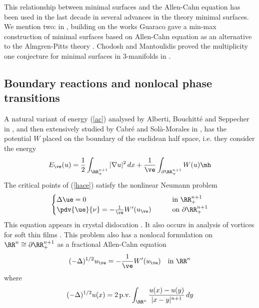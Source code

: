 This relationship between minimal surfaces and the Allen-Cahn equation has been used in the last decade in several advances in the theory minimal surfaces. We mention two: in \cite{g}, building on the works \cite{ht,tw} Guaraco gave a min-max construction of minimal surfaces based on Allen-Cahn equation as an alternative to the Almgren-Pitts theory \cite{p}. Chodosh and Mantoulidis proved the multiplicity one conjecture for minimal surfaces in $3$-manifolds in \cite{cm}.  

\subsection{Boundary reactions and nonlocal phase transitions} A natural variant of energy (\ref{ac}) analysed by Alberti, Bouchitté and Seppecher in \cite{abs}, and then extensively studied by Cabré and Solà-Morales in \cite{csm}, has the potential $W$ placed on the boundary of the euclidean half space, i.e. they consider the energy
\begin{equation} \label{hace}
   E_{\ve}(u)= \frac{1}{2}\int_{\RR^{n+1}_+} |\nabla u|^2 \,dx + \frac{1}{\ve}\int_{\partial \RR^{n+1}_+}  W(u) \mh
\end{equation}
The critical points of (\ref{hace}) satisfy the nonlinear Neumann problem 
 \begin{equation} \label{ext}
        \begin{cases}
            \Delta \ue = 0 \qquad &\text{in } \RR^{n+1}_+ \\
            \pdv{\ue}{\nu} = -\frac{1}{\ve}W'(u_\ve) \qquad  &\text{on  } \partial \RR^{n+1}_+ 
        \end{cases}
    \end{equation}
This equation appears in crystal dislocation \cite{gm,to}. It also occurs in analysis of vortices for soft thin films \cite{k}. This problem also has a nonlocal formulation on $\RR^n \cong \partial \RR^{n+1}_+$ as a fractional Allen-Cahn equation \cite{cs} 
\begin{equation}\label{hac}
    (-\Delta)^{1/2} u_{\ve} = -\frac{1}{\ve} W'(u_{\ve})  \quad \text{in } \RR^n
\end{equation}
where 
$$(-\Delta)^{1/2}u(x) = 2 {\, \rm p.v.} \int_{\RR^n} \frac{u(x)-u(y)}{|x-y|^{n+1}} \,dy$$

